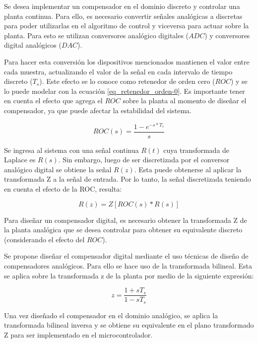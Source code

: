 Se desea implementar un compensador en el dominio discreto y controlar una planta continua. Para ello, es necesario convertir señales analógicas a discretas para poder utilizarlas en el algoritmo de control y viceversa para actuar sobre la planta. Para esto se utilizan conversores analógico digitales ($ADC$) y conversores digital analógicos ($DAC$). 

Para hacer esta conversión los dispositivos mencionados mantienen el valor entre cada muestra, actualizando el valor de la señal en cada intervalo de tiempo discreto ($T_s$). Este efecto se lo conoce como retenedor de orden cero ($ROC$) y se lo puede modelar con la ecuación \ref{eq_retenedor_orden-0}. Es importante tener en cuenta el efecto que agrega el $ROC$ sobre la planta al momento de diseñar el compensador, ya que puede afectar la estabilidad del sistema.

\begin{equation}\label{eq_retenedor_orden-0}
	ROC(s)=\frac{1-e^{-s*T_s}}{s}
\end{equation}

Se ingresa al sistema con una señal continua $R(t)$ cuya transformada de Laplace es $R(s)$. Sin embargo, luego de ser discretizada por el conversor analógico digital se obtiene la señal $R(z)$. Esta puede obtenerse al aplicar la transformada Z a la señal de entrada. Por lo tanto, la señal discretizada teniendo en cuenta el efecto de la ROC, resulta:

\begin{equation*}
	R(z)= Z[ROC(s)*R(s)]
\end{equation*}

Para diseñar un compensador digital, es necesario obtener la transformada Z de la planta analógica que se desea controlar para obtener su equivalente discreto (considerando el efecto del $ROC$). 

Se propone diseñar el compensador digital mediante el uso técnicas de diseño de compensadores analógicos. Para ello se hace uso de la transformada bilineal. Esta se aplica sobre la transformada z de la planta por medio de la siguiente expresión:


\begin{equation*}
	z=\frac{1+sT_s}{1-sT_s}
\end{equation*}


Una vez diseñado el compensador en el dominio analógico, se aplica la transformada bilineal inversa y se obtiene su equivalente en el plano transformado Z para ser implementado en el microcontrolador.


